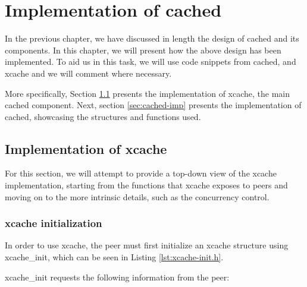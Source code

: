 \chapter{Implementation of cached}\label{ch:cached-implementation}

In the previous chapter, we have discussed in length the design of cached and 
its components. In this chapter, we will present how the above design has been
implemented. To aid us in this task, we will use code snippets from cached, and 
xcache and we will comment where necessary.

More specifically, Section \ref{sec:xcache-imp} presents the implementation of 
xcache, the main cached component. Next, section \ref{sec:cached-imp} presents 
the implementation of cached, showcasing the structures and functions used.

\section{Implementation of xcache}\label{sec:xcache-imp}

For this section, we will attempt to provide a top-down view of the xcache 
implementation, starting from the functions that xcache exposes to peers and 
moving on to the more intrinsic details, such as the concurrency control.

\subsection{xcache initialization}

In order to use xcache, the peer must first initialize an xcache structure 
using xcache\_init, which can be seen in Listing \ref{lst:xcache-init.h}.


xcache\_init requests the following information from the peer:

